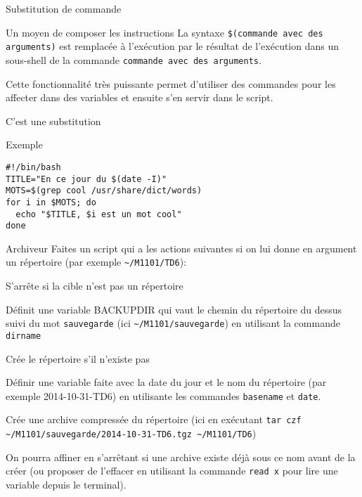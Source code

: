 \begin{frame}[fragile]{Substitution de commande}
  \begin{block}{Un moyen de composer les instructions}
    La syntaxe \verb|$(commande avec des arguments)| est remplacée à
    l'exécution par le résultat de l'exécution dans un sous-shell de la
    commande \texttt{commande avec des arguments}.

    Cette fonctionnalité très puissante permet d'utiliser des commandes
    pour les affecter dans des variables et ensuite s'en servir dans le
    script.
  
    C'est une substitution
  \end{block}
  \begin{block}{Exemple}
    \begin{center}
\begin{verbatim}
#!/bin/bash
TITLE="En ce jour du $(date -I)"
MOTS=$(grep cool /usr/share/dict/words)
for i in $MOTS; do
  echo "$TITLE, $i est un mot cool"
done
\end{verbatim} %
    \end{center}
  \end{block}

\end{frame}
\begin{exercice}
  \begin{exercicelet}{Archiveur}
    Faites un script qui a les actions suivantes si on lui donne en argument un répertoire (par exemple \verb|~/M1101/TD6|):
    \begin{questions}
    \item S'arrête si la cible n'est pas un répertoire
    \item Définit une variable BACKUPDIR qui vaut le chemin du répertoire du dessus suivi du mot \texttt{sauvegarde} (ici \verb|~/M1101/sauvegarde|) en utilisant la commande \texttt{dirname}
    \item Crée le répertoire s'il n'existe pas
    \item Définir une variable faite avec la date du jour et le nom du répertoire (par exemple 2014-10-31-TD6) en utilisante les commandes \texttt{basename} et \texttt{date}.
    \item Crée une archive compressée du répertoire (ici en exécutant \verb|tar czf ~/M1101/sauvegarde/2014-10-31-TD6.tgz ~/M1101/TD6|)
    \end{questions}
    On pourra affiner en s'arrêtant si une archive existe déjà sous ce
    nom avant de la créer (ou proposer de l'effacer en utilisant la
    commande \texttt{read x} pour lire une variable depuis le terminal).
  \end{exercicelet}
\end{exercice}
